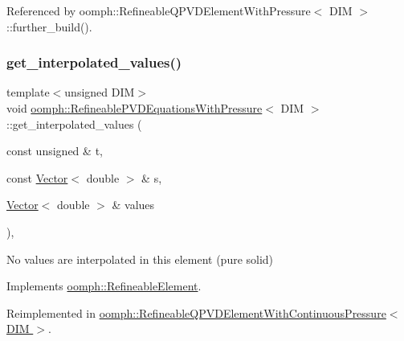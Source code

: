 Referenced by oomph\+::\+Refineable\+Q\+P\+V\+D\+Element\+With\+Pressure$<$ D\+I\+M $>$\+::further\+\_\+build().

\mbox{\label{classoomph_1_1RefineablePVDEquationsWithPressure_a15ee8b0656b7957c7063aefc3acc5d50}} 
\subsubsection{\texorpdfstring{get\+\_\+interpolated\+\_\+values()}{get\_interpolated\_values()}\hspace{0.1cm}{\footnotesize\ttfamily [1/2]}}
{\footnotesize\ttfamily template$<$unsigned D\+IM$>$ \\
void \hyperlink{classoomph_1_1RefineablePVDEquationsWithPressure}{oomph\+::\+Refineable\+P\+V\+D\+Equations\+With\+Pressure}$<$ D\+IM $>$\+::get\+\_\+interpolated\+\_\+values (\begin{DoxyParamCaption}\item[{const unsigned \&}]{t,  }\item[{const \hyperlink{classoomph_1_1Vector}{Vector}$<$ double $>$ \&}]{s,  }\item[{\hyperlink{classoomph_1_1Vector}{Vector}$<$ double $>$ \&}]{values }\end{DoxyParamCaption})\hspace{0.3cm}{\ttfamily [inline]}, {\ttfamily [virtual]}}



No values are interpolated in this element (pure solid) 



Implements \hyperlink{classoomph_1_1RefineableElement_ada6f0efe831ffefb1d2829ce01d45bfc}{oomph\+::\+Refineable\+Element}.



Reimplemented in \hyperlink{classoomph_1_1RefineableQPVDElementWithContinuousPressure_afed4014b4823a87360efcf723d52b5f5}{oomph\+::\+Refineable\+Q\+P\+V\+D\+Element\+With\+Continuous\+Pressure$<$ D\+I\+M $>$}.



